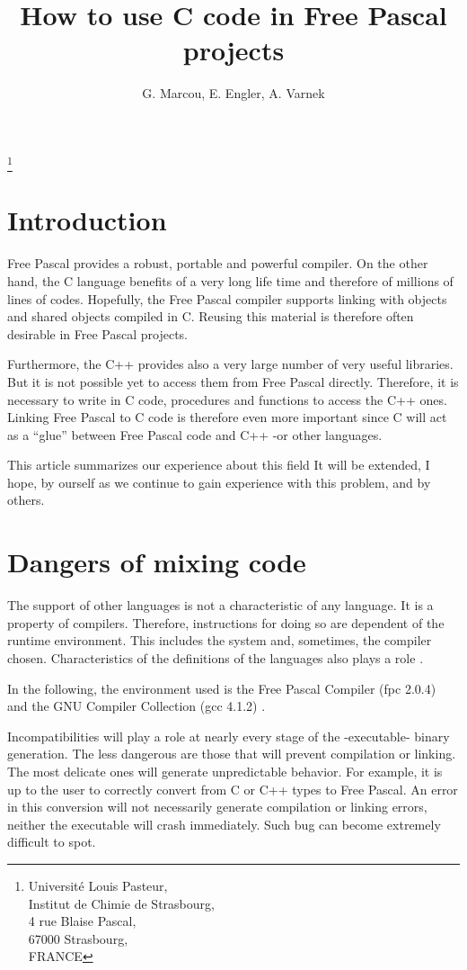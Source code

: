 \documentclass[A4paper]{article}
\title{How to use C code in Free Pascal projects}
\author{G. Marcou, E. Engler, A. Varnek}
\begin{document}
\maketitle\footnote{Universit\'e Louis Pasteur,\\ Institut de Chimie de Strasbourg,\\ 4 rue Blaise Pascal,\\ 67000 Strasbourg,\\ FRANCE}

\section{Introduction}

Free Pascal provides a robust, portable and powerful compiler\cite{FPDoc}. On
the other hand, the C language benefits of a very long life time and
therefore of millions of lines of codes. Hopefully, the Free Pascal
compiler supports linking with objects and shared objects compiled in
C. Reusing this material is therefore often desirable in Free Pascal projects.

Furthermore, the C++ provides also a very large number of very useful
libraries. But it is not possible yet to access them from Free Pascal
directly\cite{FPDoc,FPFor}. Therefore, it is necessary to write in C code,
procedures and functions to access the C++ ones. Linking Free Pascal to C code
is therefore even more important since C will act as a ``glue'' between
Free Pascal code and C++ -or other languages.

This article summarizes our experience about this field
It will be extended, I hope, by ourself as we continue to gain
experience with this problem, and by others.

\section{Dangers of mixing code}

The support of other languages is not a characteristic of any
language. It is a property of compilers. Therefore, instructions for
doing so are dependent of the runtime environment. This includes the system
and, sometimes, the compiler chosen. Characteristics of the definitions of the
languages also plays a role \cite{C++}.

In the following, the environment used is the Free Pascal Compiler (fpc
2.0.4) \cite{FPDoc} and the GNU Compiler Collection (gcc 4.1.2) \cite{gcc}.

Incompatibilities will play a role at nearly every stage of the -executable-
binary generation. The less dangerous are those that will prevent compilation
or linking. The most delicate ones will generate unpredictable behavior. For
example, it is up to the user to correctly convert from C or C++ types to Free
Pascal. An error in this conversion will not necessarily generate compilation
or linking errors, neither the executable will crash immediately. Such bug can
become extremely difficult to spot.
\end{document}
